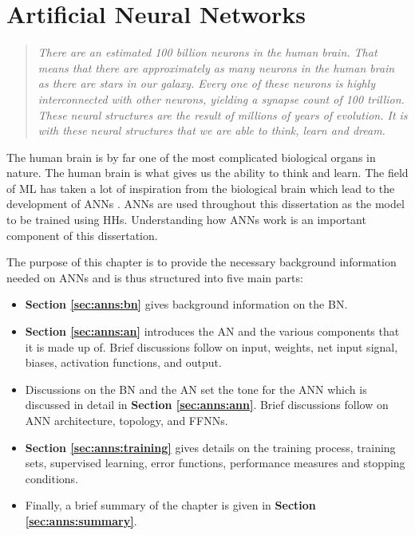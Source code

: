 \chapter{Artificial Neural Networks}
\label{chap:anns}

\begin{quote}
    \textit{There are an estimated 100 billion neurons in the human brain. That
        means that there are approximately as many neurons in the human brain as
        there are stars in our galaxy. Every one of these neurons is highly
        interconnected with other neurons, yielding a synapse count of 100
        trillion. These neural structures are the result of millions of years
        of evolution. It is with these neural structures that we are able to think,
    learn and dream.}
\end{quote}

The human brain is by far one of the most complicated biological organs in
nature. The human brain is what gives us the ability to think and learn. The
field of \ac{ML} has taken a lot of inspiration from the biological brain which
lead to the development of \acp{ANN} \cite{ref:rosenblatt:1958}. \acp{ANN}
are used throughout this dissertation as the model to be trained using \acp{HH}.
Understanding how \acp{ANN} work is an important component of this dissertation.

The purpose of this chapter is to provide the necessary background information
needed on \acp{ANN} and is thus structured into five main parts: 

\begin{itemize}
    \item
    \textbf{Section \ref{sec:anns:bn}} gives background information on the \ac{BN}.

    \item
    \textbf{Section \ref{sec:anns:an}} introduces the \ac{AN} and the various
    components that it is made up of. Brief discussions follow on
    input, weights, net input signal, biases,
    activation functions, and
    output.

    \item
    Discussions on the \ac{BN} and the \ac{AN} set the tone for the \ac{ANN}
    which is discussed in detail in \textbf{Section \ref{sec:anns:ann}}. Brief
    discussions follow on \ac{ANN} architecture, topology, and
    \acp{FFNN}. 

    \item
    \textbf{Section \ref{sec:anns:training}} gives details on the training process,
    training sets, supervised learning,
    error functions, performance measures
    and stopping conditions.

    \item
    Finally, a brief summary of the chapter is given in
    \textbf{Section \ref{sec:anns:summary}}.
\end{itemize}


